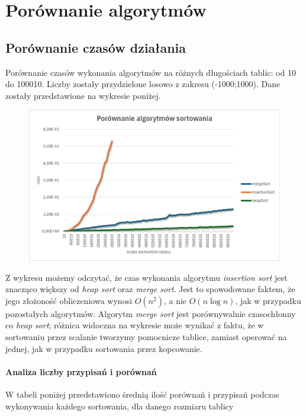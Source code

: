 \documentclass{article}
\begin{document}
	
	\section{Porównanie algorytmów}
	\subsection{Porównanie czasów działania}
	Porównanie czasów wykonania algorytmów na różnych długościach tablic: od 10 do 100010. Liczby zostały przydzielone losowo z zakresu (-1000;1000). Dane zostały przedstawione na wykresie poniżej.
	
	\begin{figure}[H]
	     \centering
	     \includegraphics[width=\textwidth]{porowanie.png}
	\end{figure}
	
	Z wykresu możemy odczytać, że czas wykonania algorytmu \textit{insertion sort} jest znacząco większy od \textit{heap sort} oraz \textit{merge sort}. Jest to spowodowane faktem, że jego złożoność obliczeniowa wynosi $O(n^2)$, a nie $O(n \log n)$, jak w przypadku pozostałych algorytmów. Algorytm \textit{merge sort} jest porównywalnie czasochłonny co \textit{heap sort}; różnica widoczna na wykresie może wynikać z faktu, że w sortowaniu przez scalanie tworzymy pomocnicze tablice, zamiast operować na jednej, jak w przypadku sortowania przez kopcowanie.
	 
	 
	 
	
	\paragraph{Analiza liczby przypisań i porównań\\}
	W tabeli poniżej przedstawiono średnią ilość porównań i przypisań podczas wykonywania każdego sortowania, dla danego rozmiaru tablicy
	
\end{document}
